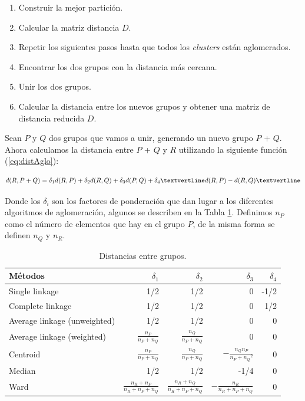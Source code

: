 \documentclass[a4paper, 20pt]{article}
\begin{document}
\begin{enumerate}
	\item Construir la mejor partición.
	\item Calcular la matriz distancia $D$.
	\item Repetir los siguientes pasos hasta que todos los \textit{clusters} están aglomerados. %
	\item Encontrar los dos grupos con la distancia más cercana.
	\item Unir los dos grupos.
	\item Calcular la distancia entre los nuevos grupos y obtener una matriz de distancia reducida $D$.
\end{enumerate}

Sean $P$ y $Q$ dos grupos que vamos a unir, generando un nuevo grupo $P$ + $Q$. Ahora calculamos la distancia entre $P$ + $Q$ y $R$ utilizando la siguiente función (\ref{eq:distAglo}):

\begin{equation}\label{eq:distAglo}
	d(R, P+Q) = \delta_1 d(R,P) + \delta_2 d(R,Q) + \delta_3 d(P,Q) + \delta_4 \textvertline d(R,P) - d(R,Q) \textvertline
\end{equation}

Donde los $\delta_i$ son los factores de ponderación que dan lugar a los diferentes algoritmos de aglomeración, algunos se describen en la Tabla \ref{tab:groupDist}. Definimos $n_P$ como el número de elementos que hay en el grupo $P$, de la misma forma se definen $n_Q$ y $n_R$.

\begin{table}[H]
  \caption{Distancias entre grupos.}
  \label{tab:groupDist}
\centering
  \begin{tabular}{lrrrr}
  \toprule
  Métodos & $\delta_1$ & $\delta_2$ & $\delta_3$ & $\delta_4$  \\
  \midrule
	Single linkage & 1/2 & 1/2 & 0 & -1/2\\
	Complete linkage & 1/2 & 1/2 & 0 & 1/2\\
	Average linkage (unweighted) & 1/2 & 1/2 & 0 & 0\\
	Average linkage (weighted) & $\frac{n_P}{n_P + n_Q}$ & $\frac{n_Q}{n_P + n_Q}$ & 0 & 0\\
	Centroid & $\frac{n_P}{n_P + n_Q}$ & $\frac{n_Q}{n_P + n_Q}$ & $-\frac{n_Q n_P}{{n_P + n_Q}^2}$ & 0\\
	Median & 1/2 & 1/2 & -1/4 & 0\\
	Ward & $\frac{n_R + n_P}{n_R + n_P + n_Q}$ & $\frac{n_R + n_Q}{n_R + n_P + n_Q}$ & $-\frac{n_R}{n_R + n_P + n_Q}$ & 0\\
  \bottomrule
\end{tabular}
\end{table}
\end{document}
